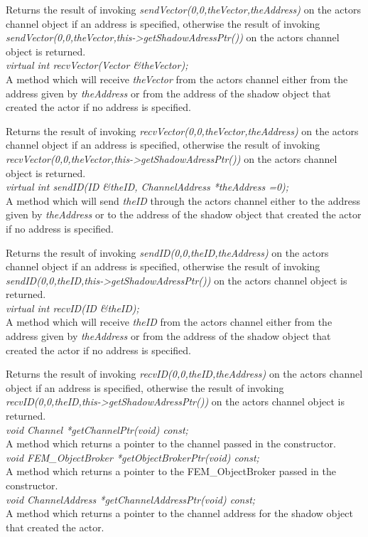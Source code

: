 Returns the result of invoking {\em sendVector(0,0,theVector,theAddress)} on
the actors channel object if an address is specified, otherwise
the result of invoking {\em
sendVector(0,0,theVector,this->getShadowAdressPtr())} on the actors channel
object is returned. \\ 


{\em virtual int recvVector(Vector \&theVector);} \\
A method which will receive {\em theVector} from
the actors channel either from the address given by {\em
theAddress} or from the address of the shadow object that created the
actor if no address is specified.

Returns the result of invoking {\em recvVector(0,0,theVector,theAddress)} on
the actors channel object if an address is specified, otherwise
the result of invoking {\em
recvVector(0,0,theVector,this->getShadowAdressPtr())} on the actors channel
object is returned. \\ 


{\em virtual int sendID(ID \&theID, ChannelAddress
*theAddress =0);}\\
A method which will send {\em theID} 
through the actors channel either to the address given by {\em
theAddress} or to the address of the shadow object that created the
actor if no address is specified.

Returns the result of invoking {\em sendID(0,0,theID,theAddress)} on
the actors channel object if an address is specified, otherwise
the result of invoking {\em
sendID(0,0,theID,this->getShadowAdressPtr())} on the actors channel
object is returned. \\ 


{\em virtual int recvID(ID \&theID);} \\
A method which will receive {\em theID} from
the actors channel either from the address given by {\em
theAddress} or from the address of the shadow object that created the
actor if no address is specified.

Returns the result of invoking {\em recvID(0,0,theID,theAddress)} on
the actors channel object if an address is specified, otherwise
the result of invoking {\em
recvID(0,0,theID,this->getShadowAdressPtr())} on the actors channel
object is returned. \\ 

{\em void Channel *getChannelPtr(void) const;}\\
A method which returns a pointer to the channel passed in the
constructor. \\

{\em void FEM\_ObjectBroker *getObjectBrokerPtr(void) const;}\\
A method which returns a pointer to the FEM\_ObjectBroker passed in the
constructor. \\

{\em void ChannelAddress *getChannelAddressPtr(void) const;}\\
A method which returns a pointer to the channel address for the shadow
object that created the actor. \\

